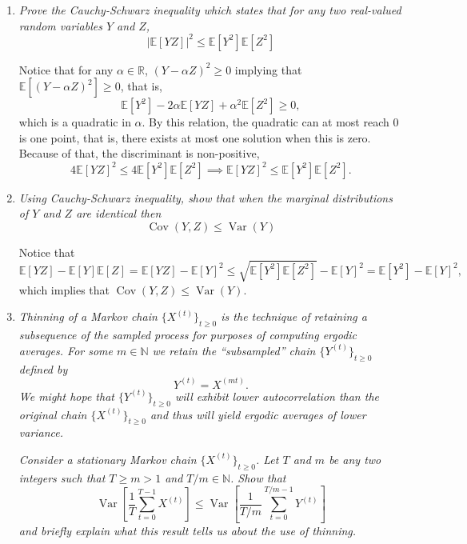 \documentclass[a4paper,12pt]{article}
\newcommand{\R}{\mathbb{R}}
\newcommand{\N}{\mathbb{N}}
\newcommand{\var}{\operatorname{Var}}
\newcommand{\ev}{\mathbb{E}}
\theoremstyle{definition}
\begin{document}
\begin{enumerate}
    \item {\it Prove the Cauchy-Schwarz inequality which states that for any two
    real-valued random variables $Y$ and $Z$,}
    $$|\ev[YZ]|^2 \le \ev[Y^2]\ev[Z^2]$$

    Notice that for any $\alpha \in \R$, $(Y-\alpha Z)^2 \ge 0$ implying that 
    $\ev[(Y - \alpha Z)^2] \ge 0$, that is, 
    $$
    \ev[Y^2] - 2\alpha \ev[YZ] + \alpha^2\ev[Z^2] \ge 0, 
    $$
    which is a quadratic in $\alpha$. By this relation, the quadratic can at
    most reach 0 is one point, that is, there exists at most one solution when
    this is zero. Because of that, the discriminant is non-positive, 
    $$
    4\ev[YZ]^2 \le 4\ev[Y^2]\ev[Z^2] \implies\ev[YZ]^2 \le \ev[Y^2]\ev[Z^2].
    $$

    \item {\it Using Cauchy-Schwarz inequality, show that when the marginal
    distributions of $Y$ and $Z$ are identical
    then}
    $$\operatorname{Cov}(Y,Z) \le \var(Y)$$

    Notice that 
    $$
    \ev[YZ] - \ev[Y]\ev[Z] = \ev[YZ] - \ev[Y]^2 \le \sqrt{\ev[Y^2]\ev[Z^2]} - \ev[Y]^2 = \ev[Y^2] - \ev[Y]^2, 
    $$
    which implies that $\operatorname{Cov}(Y,Z) \le \var(Y)$.

    \item {\it Thinning of a Markov chain $\{X^{(t)}\}_{t \ge 0}$ 
    is the technique of retaining a subsequence of the sampled
process for purposes of computing ergodic averages. For some $m \in \N$ we retain the “subsampled”
chain $\{Y^{(t)}\}_{t \ge 0}$ defined by}
    $$
    Y^{(t)} = X^{(mt)}.
    $$
    {\it We might hope that $\{Y^{(t)}\}_{t \ge 0}$ will exhibit lower
    autocorrelation than the original chain $\{X^{(t)}\}_{t \ge 0}$ and thus
    will yield ergodic averages of lower variance.}
    
    {\it Consider a stationary Markov chain $\{X^{(t)}\}_{t \ge 0}$. Let $T$ and $m$ be any two integers such that $T \ge m > 1$
    and $T /m \in \N$. Show that}
    $$
    \var\left[\frac{1}{T}\sum_{t=0}^{T-1}X^{(t)}\right] \le \var\left[\frac{1}{T/m}\sum_{t=0}^{T/m-1} Y^{(t)}\right]
    $$
    {\it and briefly explain what this result tells us about the use of
    thinning.}
    

\end{enumerate}
\end{document}
